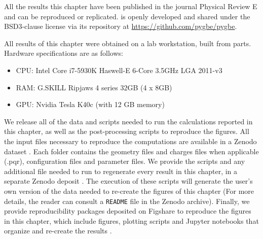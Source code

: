 All the results  this chapter have been published in the journal 
Physical Review E \cite{ClementiETal2019} and can be reproduced or replicated. \pygbe is openly developed and 
shared under the BSD3-clause license via its repository at \url{https://github.com/pygbe/pygbe}.

All results of this chapter were obtained on a lab workstation, built from parts. Hardware specifications are as follows:

\begin{itemize}
  \item CPU: Intel Core i7-5930K Haswell-E 6-Core 3.5GHz LGA 2011-v3
  \item RAM: G.SKILL Ripjaws 4 series 32GB (4 x 8GB)
  \item GPU: Nvidia Tesla K40c (with 12 GB memory)
\end{itemize}

We release all of the data and scripts needed to run the calculations reported in this chapter, 
as well as the post-processing scripts to reproduce the figures. 
All the input files necessary to reproduce the computations are available in a Zenodo dataset \cite{ClementiETal2018a}. 
Each folder contains the geometry files and charges files when applicable (.pqr), configuration files and parameter files.
We provide the scripts and any additional file needed to run \pygbe to regenerate every result in this chapter, in a 
separate Zenodo deposit \cite{ClementiETal2018b}. The execution of these scripts will generate the user's own version of the data 
needed to re-create the figures of this chapter (For more details, the reader can consult a \texttt{README} file in the Zenodo archive).
Finally, we provide reproducibility packages deposited on Figshare to reproduce the figures in this chapter, which include 
figures, plotting scripts and Jupyter notebooks that organize and re-create the results 
\cite{ClementiETal2018c,ClementiETal2018d,ClementiETal2018e,ClementiETal2018f}.

